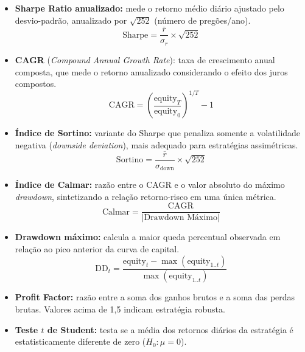 \documentclass[a4paper,10pt]{article}
\begin{document}
\begin{itemize}
  \item \textbf{Sharpe Ratio anualizado:} mede o retorno médio diário ajustado pelo desvio-padrão, anualizado por $\sqrt{252}$ (número de pregões/ano).
  \begin{equation}
    \text{Sharpe} = \frac{\bar{r}}{\sigma_r} \times \sqrt{252}
  \end{equation}

  \item \textbf{CAGR} (\textit{Compound Annual Growth Rate}): taxa de crescimento anual composta, que mede o retorno anualizado considerando o efeito dos juros compostos.
  \begin{equation}
    \text{CAGR} = \left(\frac{\text{equity}_T}{\text{equity}_0}\right)^{1/T} - 1
  \end{equation}

  \item \textbf{Índice de Sortino:} variante do Sharpe que penaliza somente a volatilidade negativa (\textit{downside deviation}), mais adequado para estratégias assimétricas.
  \begin{equation}
    \text{Sortino} = \frac{\bar{r}}{\sigma_{\text{down}}} \times \sqrt{252}
  \end{equation}

  \item \textbf{Índice de Calmar:} razão entre o CAGR e o valor absoluto do máximo \textit{drawdown}, sintetizando a relação retorno-risco em uma única métrica.
  \begin{equation}
    \text{Calmar} = \frac{\text{CAGR}}{|\text{Drawdown Máximo}|}
  \end{equation}

  \item \textbf{Drawdown máximo:} calcula a maior queda percentual observada em relação ao pico anterior da curva de capital.
  \begin{equation}
    \text{DD}_t = \frac{\text{equity}_t - \max(\text{equity}_{1..t})}{\max(\text{equity}_{1..t})}
  \end{equation}

  \item \textbf{Profit Factor:} razão entre a soma dos ganhos brutos e a soma das perdas brutas. Valores acima de 1{,}5 indicam estratégia robusta.

  \item \textbf{Teste $t$ de Student:} testa se a média dos retornos diários da estratégia é estatisticamente diferente de zero ($H_0: \mu = 0$).


\end{itemize}
\end{document}
